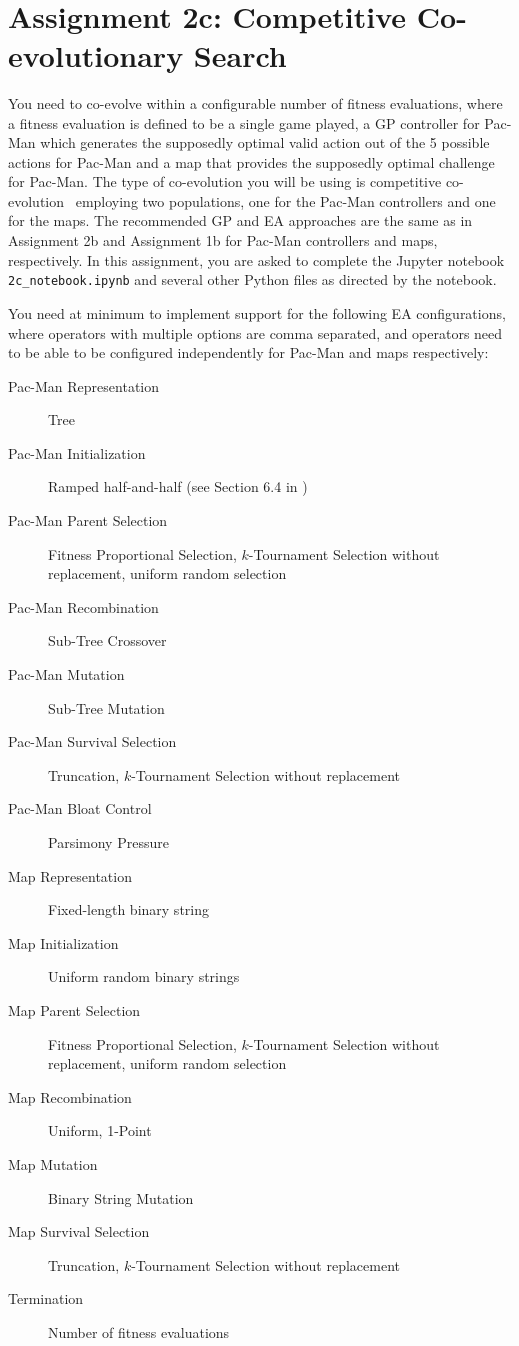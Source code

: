 \documentclass{article}
\begin{document}
\\
\newpage

\section*{Assignment 2c: Competitive Co-evolutionary Search}
You need to co-evolve within a configurable number of fitness evaluations, where a fitness evaluation is defined to be a single game played, a GP controller for Pac-Man which generates the supposedly optimal valid action out of the 5 possible actions for Pac-Man and a map that provides the supposedly optimal challenge for Pac-Man. The type of co-evolution you will be using is competitive co-evolution~\cite[Section 15.3]{Eiben2015} employing two populations, one for the Pac-Man controllers and one for the maps. The recommended GP and EA approaches are the same as in Assignment 2b and Assignment 1b for Pac-Man controllers and maps, respectively. In this assignment, you are asked to complete the Jupyter notebook \texttt{2c\_notebook.ipynb} and several other Python files as directed by the notebook.

You need at minimum to implement support for the following EA configurations, where operators with multiple options are comma separated, and operators need to be able to be configured independently for Pac-Man and maps respectively:
\begin{description}
\item[Pac-Man Representation] Tree
\item[Pac-Man Initialization] Ramped half-and-half (see Section 6.4 in \cite{Eiben2015})
\item[Pac-Man Parent Selection] Fitness Proportional Selection, $k$-Tournament Selection without replacement, uniform random selection
\item[Pac-Man Recombination] Sub-Tree Crossover
\item[Pac-Man Mutation] Sub-Tree Mutation
\item[Pac-Man Survival Selection] Truncation, $k$-Tournament Selection without replacement
\item[Pac-Man Bloat Control] Parsimony Pressure
\item[Map Representation] Fixed-length binary string
\item[Map Initialization] Uniform random binary strings
\item[Map Parent Selection] Fitness Proportional Selection, $k$-Tournament Selection without replacement, uniform random selection
\item[Map Recombination] Uniform, 1-Point
\item[Map Mutation] Binary String Mutation
\item[Map Survival Selection] Truncation, $k$-Tournament Selection without replacement
\item[Termination] Number of fitness evaluations
\end{description}
\end{document}
